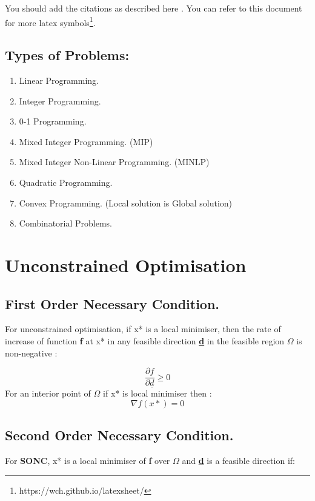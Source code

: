 \documentclass[12pt,a4paper,titlepage]{article}
\begin{document}
You should add the citations as described here \cite{sadd2009elasticity}. You can refer to this document for more latex symbols\footnote{https://wch.github.io/latexsheet/}.
%

\subsection{Types of Problems:}
\begin{enumerate}
    \item Linear Programming.
    \item Integer Programming.
    \item 0-1 Programming.
    \item Mixed Integer Programming. (MIP)
    \item Mixed Integer Non-Linear Programming. (MINLP)
    \item Quadratic Programming.
    \item Convex Programming. (Local solution is Global solution)
    \item Combinatorial Problems.
\end{enumerate}
%

\section{Unconstrained Optimisation}

\subsection{First Order Necessary Condition.}
For unconstrained optimisation, if x* is a local minimiser, then the rate of increase of function \textbf{f} at x* in any feasible direction \textbf{\underline{d}} in the feasible region $\Omega$ is non-negative :

\begin{equation}
    \dfrac{\partial f}{\partial\underline{d} } \geq 0 \label{eq1} 
\end{equation}
For an interior point of $\Omega$ if x* is local minimiser then :
\begin{equation}
    \nabla f (x*)=  0 \label{eq2} 
\end{equation}


\subsection{Second Order Necessary Condition.}
For \textbf{SONC}, x* is a local minimiser of \textbf{f} over $\Omega$ and \textbf{\underline{d}} is a feasible direction if:
\end{document}
